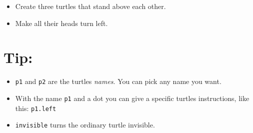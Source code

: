 \begin{itemize}

\item {Create three turtles that stand above each other.}
\item {Make all their heads turn left.}

\end{itemize}


\section*{\color{OliveGreen}Tip:}


\begin{itemize}

\item {\lstinline{p1} and \lstinline{p2} are the turtles {\it names}. You can pick any name you want.}
\item {With the name \lstinline{p1} and a dot you can give a specific turtles instructions, like this: \lstinline{p1.left}}
\item {\lstinline{invisible} turns the ordinary turtle invisible.}

\end{itemize}


